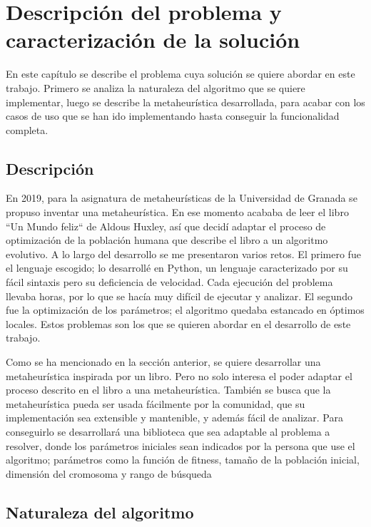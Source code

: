 \chapter{Descripción del problema y caracterización de la solución}

En este capítulo se describe el problema cuya solución se quiere abordar en este trabajo. Primero se analiza la naturaleza del algoritmo que
se quiere implementar, luego se describe la metaheurística desarrollada, para acabar con los casos de uso que se han ido 
implementando hasta conseguir la funcionalidad completa.

\section{Descripción}

En 2019, para la asignatura de metaheurísticas de la Universidad de Granada \cite{merelo_molina_2021} se propuso inventar una 
metaheurística. En ese momento acababa de leer el libro ``Un Mundo feliz`` de Aldous Huxley, así que decidí adaptar el proceso de 
optimización de la población humana que describe el libro a un algoritmo evolutivo. A lo largo del desarrollo se me presentaron varios retos.
El primero fue el lenguaje escogido; lo desarrollé en Python, un lenguaje caracterizado por su fácil sintaxis pero su deficiencia de
velocidad. Cada ejecución del problema llevaba horas, por lo que se hacía muy difícil de ejecutar y analizar. El
segundo fue la optimización de los parámetros; el algoritmo quedaba estancado en óptimos locales. Estos problemas son 
los que se quieren abordar en el desarrollo de este trabajo.

Como se ha mencionado en la sección anterior, se quiere desarrollar una metaheurística inspirada por un libro. Pero no solo interesa
el poder adaptar el proceso descrito en el libro a una metaheurística. También se busca que la metaheurística pueda ser
usada fácilmente por la comunidad, que su implementación sea extensible y mantenible, y además fácil de analizar. Para conseguirlo
se desarrollará una biblioteca que sea adaptable al problema a resolver, donde los parámetros iniciales sean 
indicados por la persona que use el algoritmo; parámetros como la función de fitness, tamaño de la población inicial,
dimensión del cromosoma y rango de búsqueda

\section{Naturaleza del algoritmo}

